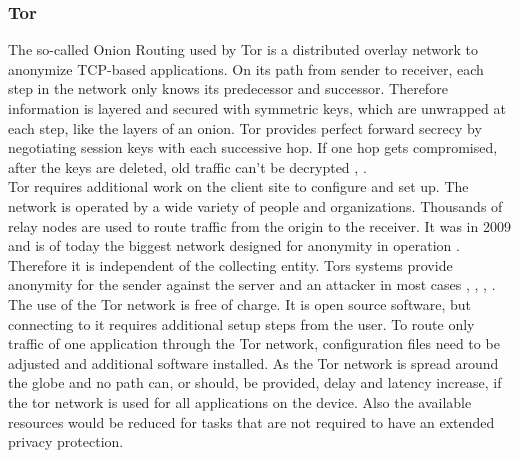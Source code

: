     \subsubsection{Tor}
        The so-called Onion Routing used  by Tor is a distributed overlay network to anonymize TCP-based applications. On its path from sender to receiver, each step in the network only knows its predecessor and successor. Therefore information is layered and secured with symmetric keys, which are unwrapped at each step, like the layers of an onion.
        Tor provides perfect forward secrecy by negotiating session keys with each successive hop. If one hop gets compromised, after the keys are deleted, old traffic can't be decrypted \cite{dingledine_tor_2004}, \cite{borisov_shining_2008}.\\
        Tor requires additional work on the client site to configure and set up. 
        The network is operated by a wide variety of people and organizations.
        Thousands of relay nodes are used to route traffic from the origin to the receiver. It was in 2009 and is of today the biggest network designed for anonymity in operation \cite{edman_anonymity_2009}.
        Therefore it is independent of the collecting entity. Tors systems provide anonymity for the sender against the server and an attacker in most cases \cite{arma_one_2009},  \cite{poulsen_feds_2013}, \cite{samson_tor_2013}, \cite{herrmann_website_2009}.\\
        The use of the Tor network is free of charge. It is open source software, but connecting to it requires additional setup steps from the user. To route only traffic of one application through the Tor network, configuration files need to be adjusted and additional software installed. As the Tor network is spread around the globe and no path can, or should, be provided, delay and latency increase, if the tor network is used for all applications on the device. Also the available resources would be reduced for tasks that are not required to have an extended privacy protection.\\
    
    
    
